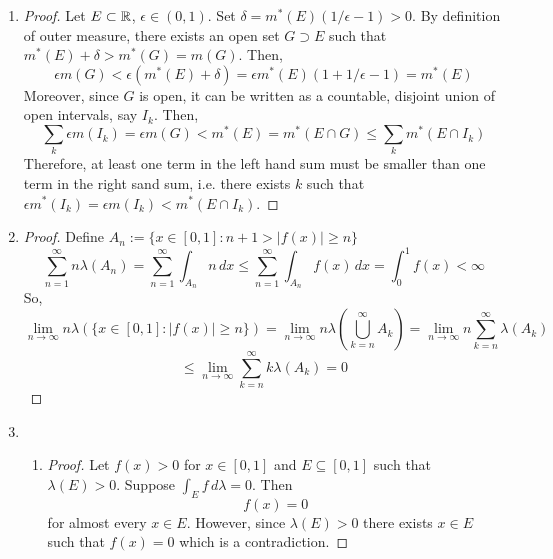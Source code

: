 \begin{enumerate}
\item \begin{proof}
	Let $E \subset \mathbb{R}$, $\epsilon \in (0,1)$. Set $\delta = m^*(E)(1/\epsilon-1)>0$. By definition of outer measure, there exists an open set $G \supset E$ such that $m^*(E) + \delta > m^*(G)=m(G)$. Then,
	\[ \epsilon m(G) < \epsilon(m^*(E)+\delta) = \epsilon m^*(E)(1+1/\epsilon-1) = m^*(E) \]
Moreover, since $G$ is open, it can be written as a countable, disjoint union of open intervals, say ${I_k}$. Then,
	\[ \sum_k \epsilon m(I_k) = \epsilon m(G) < m^*(E) = m^*(E \cap G) \le \sum_k m^*(E \cap I_k) \]
Therefore, at least one term in the left hand sum must be smaller than one term in the right sand sum, i.e. there exists $k$ such that $\epsilon m^*(I_k) = \epsilon m(I_k) < m^*(E \cap I_k)$.
\end{proof}

\item \begin{proof}
	Define $A_n := \{ x \in [0,1] : n+1 > |f(x)| \ge n \}$
		\[ \sum_{n=1}^\infty n \lambda(A_n) = \sum_{n=1}^\infty \int_{A_n} n \, dx \le \sum_{n=1}^\infty \int_{A_n} f(x) \, dx = \int_0^1 f(x) < \infty \]
	So,
		\[ \lim_{n\to\infty} n \lambda( \{ x \in [0,1]: |f(x)| \ge n \}) = \lim_{n\to\infty} n \lambda\left( \bigcup_{k=n}^\infty A_k \right) = \lim_{n \to \infty} n \sum_{k=n}^\infty \lambda(A_k) \] 
		\[ \le \lim_{n\to\infty} \sum_{k=n}^\infty k\lambda(A_k) =0\]
\end{proof}

\item
	\begin{enumerate}
		\item \begin{proof} Let $f(x)>0$ for $x \in [0,1]$ and $E \subseteq [0,1]$ such that $\lambda(E) >0$. Suppose $\int_E f \, d\lambda =0$. Then
			\[ f(x)=0 \]
		for almost every $x \in E$. However, since $\lambda(E)>0$ there exists $x \in E$ such that $f(x)=0$ which is a contradiction.
		\end{proof}


\end{enumerate}
\end{enumerate}
